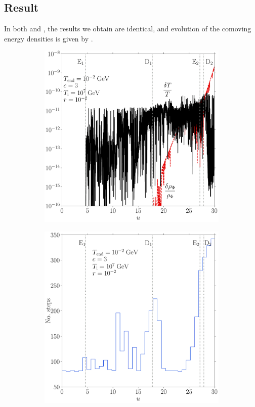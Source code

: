 \documentclass[11pt,a4paper]{article}
\begin{document}
\subsection{Result} 
%
In both \CPP and \PY, the results we obtain are identical, and evolution of the comoving energy densities is given by . 
%
\begin{figure}[t]
	\begin{subfigure}{0.5\textwidth}
		\includegraphics[width=1\textwidth]{EMD_err.pdf}
		\caption{}
		\label{fig:EMD_err}
	\end{subfigure}
	\begin{subfigure}{0.5\textwidth}
		\includegraphics[width=1\textwidth]{EMD_hist.pdf}

\end{subfigure}
\end{figure}
\end{document}
